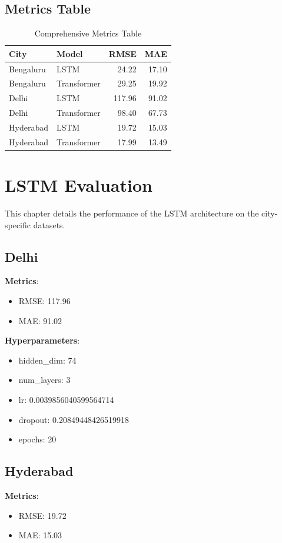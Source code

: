 \documentclass[12pt,a4paper]{book}
\begin{document}
\section{Metrics Table}
\begin{table}[H]
    \centering
    \begin{tabular}{llrr}
    \toprule
    \textbf{City} & \textbf{Model} & \textbf{RMSE} & \textbf{MAE} \\
    \midrule
    Bengaluru & LSTM & 24.22 & 17.10 \\
    Bengaluru & Transformer & 29.25 & 19.92 \\
    Delhi & LSTM & 117.96 & 91.02 \\
    Delhi & Transformer & 98.40 & 67.73 \\
    Hyderabad & LSTM & 19.72 & 15.03 \\
    Hyderabad & Transformer & 17.99 & 13.49 \\
    \bottomrule
    \end{tabular}
    \caption{Comprehensive Metrics Table}
\end{table}
\chapter{LSTM Evaluation}
This chapter details the performance of the LSTM architecture on the city-specific datasets.

\section{Delhi}
\textbf{Metrics}:
\begin{itemize}
    \item RMSE: 117.96
    \item MAE: 91.02
\end{itemize}

\textbf{Hyperparameters}:
\begin{itemize}
    \item hidden\_dim: 74
    \item num\_layers: 3
    \item lr: 0.0039856040599564714
    \item dropout: 0.20849448426519918
    \item epochs: 20
\end{itemize}

\section{Hyderabad}
\textbf{Metrics}:
\begin{itemize}
    \item RMSE: 19.72
    \item MAE: 15.03
\end{itemize}
\end{document}
